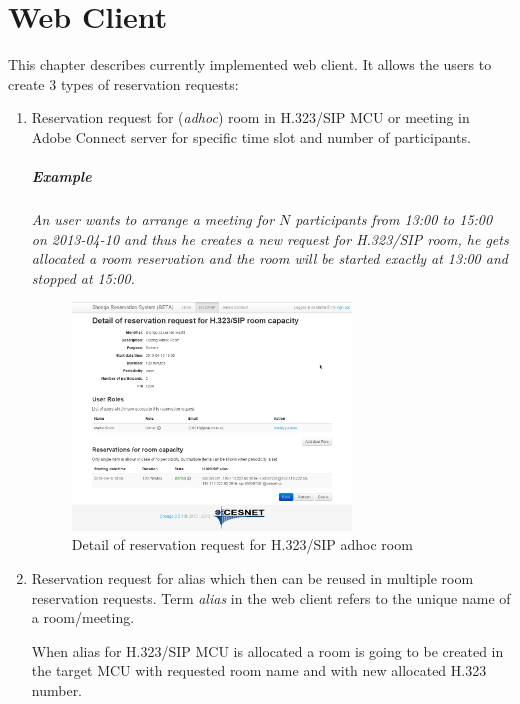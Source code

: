 \chapter{Web Client}

This chapter describes currently implemented web client. It allows the users to create 3 types of reservation requests:

\begin{enumerate}
\item Reservation request for (\textit{adhoc}) room in H.323/SIP MCU or meeting in Adobe Connect server for specific time slot and number of participants. 
\paragraph{Example}
\textit{An user wants to arrange a meeting for $N$ participants from 13:00 to 15:00 on 2013-04-10 and thus he creates a new request for H.323/SIP room, he gets allocated a room reservation and the room will be started exactly at 13:00 and stopped at 15:00.}

\begin{figure}[ht!]
\centering\includegraphics[width=0.7\textwidth]{images/client_web_detail_room.png}
\caption{Detail of reservation request for H.323/SIP adhoc room}
\label{fig:client-web-detail-alias}
\end{figure}

\item Reservation request for alias which then can be reused in multiple room reservation requests. Term \textit{alias} in the web client refers to the unique name of a room/meeting.

When alias for H.323/SIP MCU is allocated a room is going to be created in the target MCU with requested room name and with new allocated H.323 number.


\end{enumerate}
